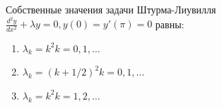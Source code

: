 Собственные значения задачи Штурма-Лиувилля  \(\frac{d^2y}{dx^2}+\lambda y =0, y\left(0\right)=y'\left(\pi \right) =0\) равны:

\begin{enumerate}[label=\arabic*)]
    \item \(\lambda _k=k^2 k=0,1,\dots\)
    \item \(\lambda _k=(k+1/2)^2 k=0,1,\dots\)
    \item \(\lambda _k=k^2 k=1,2,\dots\)
\end{enumerate}

